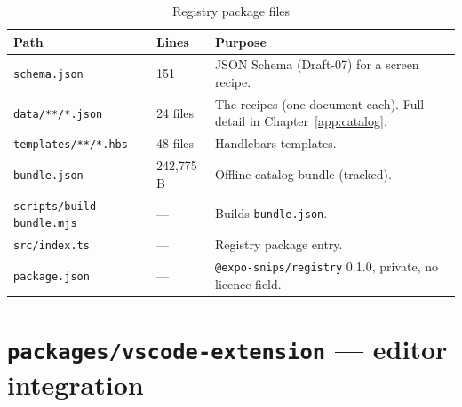 \begin{longtable}{p{6cm}p{2.2cm}p{6.2cm}}
\caption{Registry package files}\\
\toprule
\textbf{Path} & \textbf{Lines} & \textbf{Purpose} \\
\midrule

\texttt{schema.json} & 151 & JSON Schema (Draft-07) for a screen recipe. \\
\texttt{data/**/*.json} & 24 files & The recipes (one document each). Full detail
in Chapter~\ref{app:catalog}. \\
\texttt{templates/**/*.hbs} & 48 files & Handlebars templates. \\
\texttt{bundle.json} & 242{,}775 B & Offline catalog bundle (tracked). \\
\texttt{scripts/build-bundle.mjs} & --- & Builds \texttt{bundle.json}. \\
\texttt{src/index.ts} & --- & Registry package entry. \\
\texttt{package.json} & --- & \texttt{@expo-snips/registry} 0.1.0, private, no
licence field. \\
\bottomrule
\end{longtable}

\section{\texttt{packages/vscode-extension} --- editor integration}

